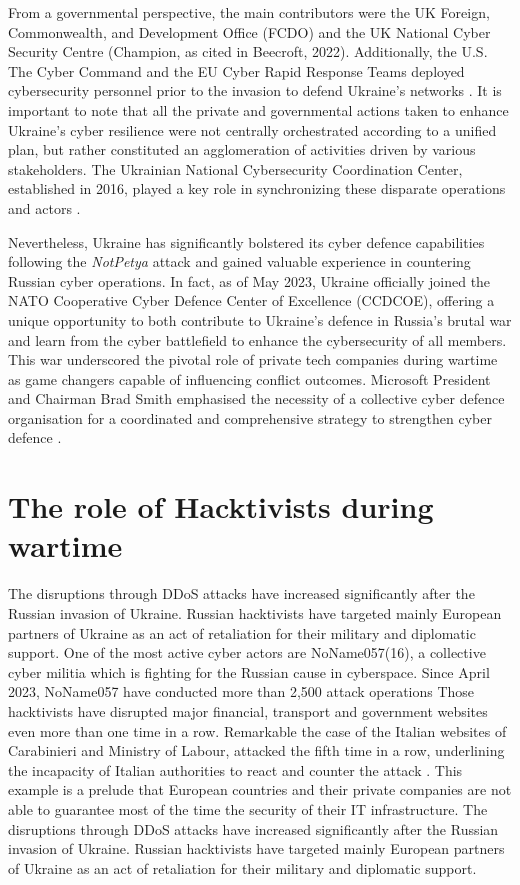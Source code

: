 From a governmental perspective, the main contributors were the UK Foreign, Commonwealth, and Development Office (FCDO) and the UK National Cyber Security Centre (Champion, as cited in Beecroft, 2022). Additionally, the U.S. The Cyber Command and the EU Cyber Rapid Response Teams deployed cybersecurity personnel prior to the invasion to defend Ukraine's networks \autocite[3]{beecroft_2022_evaluating}. It is important to note that all the private and governmental actions taken to enhance Ukraine's cyber resilience were not centrally orchestrated according to a unified plan, but rather constituted an agglomeration of activities driven by various stakeholders. The Ukrainian National Cybersecurity Coordination Center, established in 2016, played a key role in synchronizing these disparate operations and actors \autocite[3]{beecroft_2022_evaluating}.

Nevertheless, Ukraine has significantly bolstered its cyber defence capabilities following the \textit{NotPetya} attack and gained valuable experience in countering Russian cyber operations. In fact, as of May 2023, Ukraine officially joined the NATO Cooperative Cyber Defence Center of Excellence (CCDCOE), offering a unique opportunity to both contribute to Ukraine's defence in Russia's brutal war and learn from the cyber battlefield to enhance the cybersecurity of all members. This war underscored the pivotal role of private tech companies during wartime as game changers capable of influencing conflict outcomes. Microsoft President and Chairman Brad Smith emphasised the necessity of a collective cyber defence organisation for a coordinated and comprehensive strategy to strengthen cyber defence \parencite{smith_2022_defending, beecroft_2022_evaluating}.

\section{The role of Hacktivists during wartime}

The disruptions through DDoS attacks have increased significantly after the Russian invasion of Ukraine. Russian hacktivists have targeted mainly European partners of Ukraine as an act of retaliation for their military and diplomatic support. One of the most active cyber actors are NoName057(16), a collective cyber militia which is fighting for the Russian cause in cyberspace. Since April 2023, NoName057 have conducted more than 2,500 attack operations  Those hacktivists have disrupted major financial, transport and government websites even more than one time in a row.  Remarkable the case of the Italian websites of Carabinieri and Ministry of Labour, attacked the fifth time in a row, underlining the incapacity of Italian authorities to react and counter the attack \autocite{redhotcyber_2023_colpito}. This example is a prelude that European countries and their private companies are not able to guarantee most of the time the security of their IT infrastructure. The disruptions through DDoS attacks have increased significantly after the Russian invasion of Ukraine. Russian hacktivists have targeted mainly European partners of Ukraine as an act of retaliation for their military and diplomatic support. 

